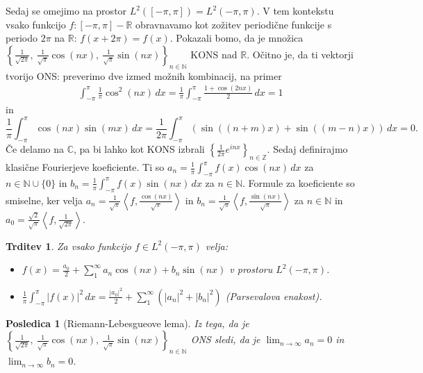 \documentclass[10pt, a4paper]{article}
\newtheorem{posledica}[izr]{Posledica}
\newtheorem{trditev}[izr]{Trditev}
\newcommand{\N}{\mathbb {N}}
\newcommand{\Z}{\mathbb {Z}}
\newcommand{\R}{\mathbb {R}}
\newcommand{\C}{\mathbb {C}}
\newcommand{\sprod}[2]{\left\langle {#1},{#2} \right\rangle}
\begin{document}
Sedaj se omejimo na prostor $L^2 ([-\pi, \pi]) = L^2 (-\pi, \pi)$.
V tem kontekstu vsako funkcijo $f: [-\pi, \pi] - \R$ obravnavamo kot zožitev periodične funkcije s periodo $2 \pi$ na $\R$: $f(x + 2\pi) = f(x)$.
Pokazali bomo, da je množica $\left\lbrace\frac{1}{\sqrt{2\pi}},\ \frac{1}{\sqrt{\pi}} \cos(nx),\ \frac{1}{\sqrt{\pi}} \sin(nx)\right\rbrace_{n \in \N}$ KONS 
nad $\R$.
Očitno je, da ti vektorji tvorijo ONS: preverimo dve izmed možnih kombinacij, na primer
\begin{gather*}
    \int_{-\pi} ^{\pi} \frac{1}{\pi} \cos^2 (nx)\, dx = \frac{1}{\pi} \int_{-\pi} ^\pi \frac{1 + \cos(2nx)}{2}\, dx = 1
\end{gather*}
in $$\frac{1}{\pi} \int_{-\pi} ^\pi \cos(nx) \sin(mx)\, dx = \frac{1}{2\pi} \int_{-\pi} ^\pi (\sin ((n + m)x) + \sin ((m - n)x))\, dx = 0.$$
Če delamo na $\C$, pa bi lahko kot KONS izbrali $\left\lbrace \frac{1}{2\pi} e^{inx} \right\rbrace_{n \in \Z}$.
Sedaj definirajmo klasične Fourierjeve koeficiente. Ti so $a_n = \frac{1}{\pi} \int_{-\pi} ^\pi f(x)\cos (nx)\, dx$ za $n \in \N \cup \{0\}$
in $b_n = \frac{1}{\pi} \int_{-\pi} ^\pi f(x)\sin (nx)\, dx$ za $n \in \N$.
Formule za koeficiente so smiselne, ker velja $a_n = \frac{1}{\sqrt{\pi}} \sprod{f}{\frac{\cos (nx)}{\sqrt{\pi}}}$
in $b_n = \frac{1}{\sqrt{\pi}} \sprod{f}{\frac{\sin (nx)}{\sqrt{\pi}}}$ za $n \in \N$ in 
$a_0 = \frac{\sqrt{2}}{\sqrt{\pi}} \sprod{f}{\frac{1}{\sqrt{2\pi}}}$.

\begin{trditev}
    Za vsako funkcijo $f \in L^2 (-\pi, \pi)$ velja:
    \begin{itemize}
        \item $f(x) = \frac{a_0}{2} + \sum_1 ^\infty a_n \cos (nx) + b_n \sin (nx)$ v prostoru $L^2 (-\pi, \pi)$.
        \item $\frac{1}{\pi} \int_{-\pi} ^\pi |f(x)|^2\, dx = \frac{|a_0|^2}{2} + \sum_1 ^\infty (|a_n|^2 + |b_n|^2)$ (Parsevalova enakost).
    \end{itemize}
\end{trditev}

\begin{posledica}[Riemann-Lebesgueove lema]
    Iz tega, da je $\left\lbrace\frac{1}{\sqrt{2\pi}},\ \frac{1}{\sqrt{\pi}} \cos(nx),\ \frac{1}{\sqrt{\pi}} \sin(nx)\right\rbrace_{n \in \N}$ ONS sledi, da je
    $\lim_{n \to \infty} a_n = 0$ in $\lim_{n \to \infty} b_n = 0$.
\end{posledica}
\end{document}
